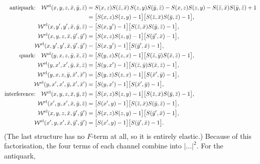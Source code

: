 \documentclass[9pt]{article}
\numberwithin{equation}{section}
\begin{document}
\begin{align}
\text{antiquark:}\hspace{1em} \mathcal{W}^{\text{el}}(x,y,z,\Bar{x},\Bar{y},\Bar{z}) & = S(x,z)S(\Bar{z},\Bar{x})\,S(z,y)S(\Bar{y},\Bar{z})-S(x,z)S(z,y)-S(\Bar{z},\Bar{x})S(\Bar{y},\Bar{z})+1\notag \\ & = \big[S(x,z)S(z,y)-1\big]\big[S(\Bar{z},\Bar{x})S(\Bar{y},\Bar{z})-1\big],\notag \\
\mathcal{W}^{\text{el}}(x,y',y',\Bar{x},\Bar{y},\Bar{z}) & = \big[S(x,y')-1\big]\big[S(\Bar{z},\Bar{x})S(\Bar{y},\Bar{z})-1\big],\notag \\
\mathcal{W}^{\text{el}}(x,y,z,\Bar{x},\Bar{y}',\Bar{y}') & = \big[S(x,z)S(z,y)-1\big]\big[S(\Bar{y}',\Bar{x})-1\big],\notag \\
\mathcal{W}^{\text{el}}(x,y',y',\Bar{x},\Bar{y}',\Bar{y}') & = \big[S(x,y')-1\big]\big[S(\Bar{y}',\Bar{x})-1\big],\notag \\
\text{quark:}\hspace{1em} \mathcal{W}^{\text{el}}(y,x,z,\Bar{y},\Bar{x},\Bar{z}) & = \big[S(y,z)S(z,x)-1\big]\big[S(\Bar{z},\Bar{y})S(\Bar{x},\Bar{z})-1\big],\notag \\
\mathcal{W}^{\text{el}}(y,x',x',\Bar{y},\Bar{x},\Bar{z}) & = \big[S(y,x')-1\big]\big[S(\Bar{z},\Bar{y})S(\Bar{x},\Bar{z})-1\big],\notag \\
\mathcal{W}^{\text{el}}(y,x,z,\Bar{y},\Bar{x}',\Bar{x}') & = \big[S(y,z)S(z,x)-1\big]\big[S(\Bar{x}',\Bar{y})-1\big],\notag \\
\mathcal{W}^{\text{el}}(y,x',x',\Bar{y},\Bar{x}',\Bar{x}') & = \big[S(y,x')-1\big]\big[S(\Bar{x}',\Bar{y})-1\big],\notag \\
\text{interference:}\hspace{1em} \mathcal{W}^{\text{el}}(x,y,z,\Bar{x},\Bar{y},\Bar{z}) & = \big[S(x,z)S(z,y)-1\big]\big[S(\Bar{z},\Bar{x})S(\Bar{y},\Bar{z})-1\big],\notag \\
\mathcal{W}^{\text{el}}(x',y,x',\Bar{x},\Bar{y},\Bar{z}) & = \big[S(x',y)-1\big]\big[S(\Bar{z},\Bar{x})S(\Bar{y},\Bar{z})-1\big],\notag \\
\mathcal{W}^{\text{el}}(x,y,z,\Bar{x},\Bar{y}',\Bar{y}') & = \big[S(x,z)S(z,y)-1\big]\big[S(\Bar{y}',\Bar{x})-1\big],\notag \\
\mathcal{W}^{\text{el}}(x',y,x',\Bar{x},\Bar{y}',\Bar{y}') & = \big[S(x',y)-1\big]\big[S(\Bar{y}',\Bar{x})-1\big].
\end{align}
(The last structure has no $F$-term at all, so it is entirely elastic.) Because of this factorisation, the four terms of each channel combine into $|\ldots|^{2}$. For the antiquark,
\end{document}
